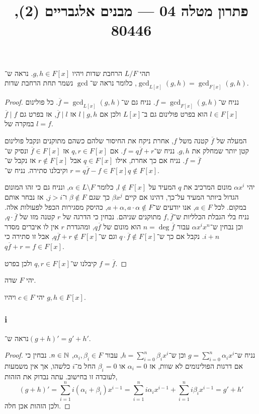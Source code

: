 
\title{פתרון מטלה 04 --- מבנים אלגבריים (2), 80446}


\maketitle
\maketitleprint[red]

\question{}
תהי $L / F$ הרחבת שדות ויהיו $g, h \in F[x]$.
נראה ש־$\gcd_{L[x]}(g, h) = \gcd_{F[x]}(g, h)$, כלומר נראה ש־$\gcd$ נשמר תחת הרחבת שדות.
\begin{proof}
	נניח ש־$f = \gcd_{F[x]}(g, h)$.
	נניח גם ש־$\overline{f} = \gcd_{L[x]}(g, h)$.
	כל פולינום $l \in F[x]$ הוא בפרט פולינום גם ב־$L[x]$ ולכן אם $l \mid g, h$ אז $\overline{f} \mid l$, אז בפרט גם $\overline{f} \mid f$ במקרה של $l = f$.

	המעלה של $\overline{f}$ קטנה משל $f$, אחרת ניקח את החיסור שלהם כשהם מתוקנים ונקבל פולינום קטן יותר שמחלק את $g, h$.
	נניח ש־$f = q \overline{f} + r$.
	אם $q, r \in F[x]$ אז $\overline{f} \in F[x]$ ונסיק ש־$f = \overline{f}$.
	נניח אם כך אחרת, אילו $q \in F[x]$ אבל $r \notin F[x]$ אז נקבל ש־$r = q \overline{f} - f \in F[x]$ וקיבלנו סתירה.
	נניח ש־$q \notin F[x]$.

	יהי $\alpha x^i$ מונום המרכיב את $q$ המעיד על $l \notin F[x]$, כלומר $\alpha \in L \setminus F$, ונניח גם כי זהו המונום הגדול ביותר המעיד על־כך, דהינו אם קיים $\beta x^j$ כך שגם $\beta \notin F$ ו־$j > i$, אז נבחר אותם במקום.
	לכל $a \in F$, אנו יודעים ש־$a + \alpha, a \cdot \alpha \notin F$, כהיסק מסגירות הכפל לפעולות אלה.
	נניח בלי הגבלת הכלליות ש־$f, \overline{f}$ מתוקנים שניהם.
	נבחין כי הדרגה של $r$ קטנה מזו של $q \cdot \overline{f}$, וכן נבחין ש־$\alpha x^i x^n$ עבור $n = \deg \overline{f}$ הוא מונום של $q \overline{f}$, ומהגדרת $r$ אין לו איברים מסדר $i + n$.
	נקבל אם כך ש־$q \cdot \overline{f} \notin F[x]$ וגם ש־$q \overline{f} + r \notin F[x]$, אבל זו סתירה כי $q \overline{f} + r = f \in F[x]$.
	
	קיבלנו ש־$q, r \in F[x]$ ולכן בפרט $f = \overline{f}$.
\end{proof}

\question{}
יהי $F$ שדה.

\subquestion{}
יהי $c \in F$ ויהיו $g, h \in F[x]$.

\subsubsection{i}
נראה ש־${(g + h)}' = g' + h'$.
\begin{proof}
	נניח ש־$g = \sum_{i = 0}^n \alpha_i x^i$ וכן ש־$h = \sum_{i = 0}^n \beta_i x^i$, עבור $\alpha_i, \beta_i \in F$, $n \in \mathbb{N}$.
	נבחין כי אם דרגות הפולינומים לא שוות, אז $\alpha_i = 0$ או $\beta_i = 0$ החל מ־$i$ כלשהו, אך אין משמעות לעובדה זו בחישוב.
	עתה נבדוק את הזהות,
	\[
		(g + h)'
		= \sum_{i = 1}^n i (\alpha_i + \beta_i) x^{i - 1}
		= \sum_{i = 1}^n i \alpha_i x^{i - 1} + \sum_{i = 1}^n i \beta_i x^{i - 1}
		= g' + h'
	\]
	ולכן הזהות אכן חלה.
\end{proof}

